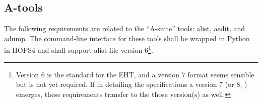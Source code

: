 
\subsection{A-tools}
\label{sec:areq}

The following requirements are related to the ``A-suite'' tools: \acs{alist}, \acs{aedit},
and \acs{adump}.  The command-line interface for these tools shall be wrapped
in Python in HOPS4 and shall support alist file version 6\footnote{Version 6 is the standard for the \ac{EHT}, and a version 7 format seems
sensible but is not yet required.  If in detailing the specifications
a version 7 (or 8, \etc) emerges, these requirements transfer
to the those version(s) as well.}.





